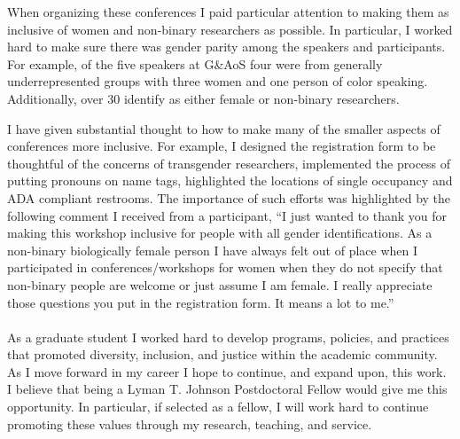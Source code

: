 \documentclass[11pt]{article}
\begin{document}
When organizing these conferences I paid particular attention to making them as inclusive of women and non-binary researchers as possible. In particular, I worked hard to make sure there was gender parity among the speakers and participants.  For example, of the five speakers at G\&AoS four were from generally underrepresented groups with three women and one person of color speaking. Additionally, over 30 identify as either female or non-binary researchers. 

I have given substantial thought to how to make many of the smaller aspects of conferences more inclusive. For example, I designed the registration form to be thoughtful of the concerns of transgender researchers, implemented the process of putting pronouns on name tags, highlighted the locations of single occupancy and ADA compliant restrooms. The importance of such efforts was highlighted by the following comment I received from a participant, ``I just wanted to thank you for making this workshop inclusive for people with all gender identifications. As a non-binary biologically female person I have always felt out of place when I participated in conferences/workshops for women when they do not specify that non-binary people are welcome or just assume I am female. I really appreciate those questions you put in the registration form. It means a lot to me.''
\\
\\
As a graduate student I worked hard to develop programs, policies, and practices that promoted diversity, inclusion, and justice within the academic community. As I move forward in my career I hope to continue, and expand upon, this work. I believe that being a Lyman T. Johnson Postdoctoral Fellow would give me this opportunity.  In particular, if selected as a fellow, I will work hard to continue promoting these values through my research, teaching, and service. 



%
%
%
\end{document}
